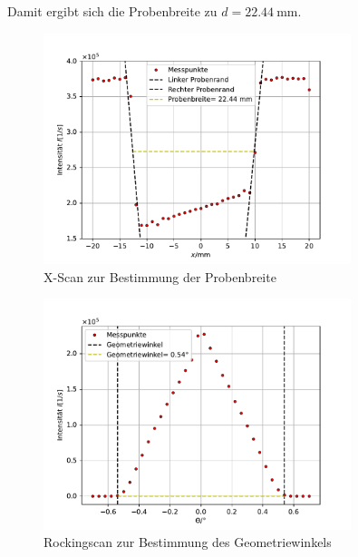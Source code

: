 Damit ergibt sich die Probenbreite zu $d=\SI{22.44}{\milli\meter}$.
\begin{figure}[H]
    \centering
    \includegraphics[width=0.8\textwidth]{plots/Xscan.pdf}
    \caption{X-Scan zur Bestimmung der Probenbreite}
    \label{fig:Xscan}
\end{figure}

\begin{figure}[H]
    \centering
    \includegraphics[width=0.8\textwidth]{plots/Rocking.pdf}
    \caption{Rockingscan zur Bestimmung des Geometriewinkels}
    \label{fig:Rocking}
\end{figure}
